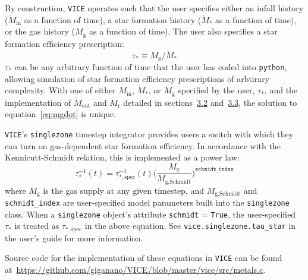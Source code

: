 \documentclass{report}
\begin{document}
\par\null\par\noindent 
By construction, \texttt{VICE} operates such that the user specifies either an 
infall history ($\dot{M}_\text{in}$ as a function of time), a star formation 
history ($\dot{M}_*$ as a function of time), or the gas history ($M_\text{g}$ 
as a function of time). The user also specifies a star formation efficiency 
prescription: 
\begin{equation}
\tau_* \equiv M_\text{g} / \dot{M}_*
\end{equation} 
$\tau_*$ can be any arbitrary function of time that the user has coded into 
\texttt{python}, allowing simulation of star formation efficiency prescriptions 
of arbtirary complexity. With one of either $\dot{M}_\text{in}$, $\dot{M}_*$, 
or $M_\text{g}$ specified by the user, $\tau_*$, and the implementation of 
$\dot{M}_\text{out}$ and $\dot{M}_\text{r}$ detailed in 
sections~\hyperlink{gas:outflows}{3.2} and~\hyperlink{gas:recycling}{3.3}, the 
solution to equation~\ref{eq:mgdot} is unique. 
\par
\texttt{VICE}'s \texttt{singlezone} timestep integrator provides users a 
switch with which they can turn on gas-dependent star formation efficiency. 
In accordance with the Kennicutt-Schmidt relation, this is implemented as a 
power law: 
\begin{equation}
\tau_*^{-1}(t) = \tau_{*,\text{spec}}^{-1}(t)\Big(\frac{
	M_\text{g}
}{
	M_\text{g,Schmidt}
}\Big)^\texttt{schmidt\_index}
\end{equation}
where $M_\text{g}$ is the gas supply at any given timestep, and 
$M_\text{g,Schmidt}$ and \texttt{schmidt\_index} are user-specified model 
parameters built into the \texttt{singlezone} class. When a \texttt{singlezone} 
object's attribute \texttt{schmidt} = \texttt{True}, the user-specified 
$\tau_*$ is treated as $\tau_{*,\text{spec}}$ in the above equation. See 
\texttt{vice.singlezone.tau\_star} in the user's guide for more information.  
\par
Source code for the implementation of these equations in \texttt{VICE} can 
be found at~\url{https://github.com/giganano/VICE/blob/master/vice/src/metals.c}. 
\end{document}
